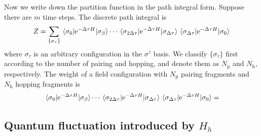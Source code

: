 \documentclass[hyperref, a4paper]{article}
\newcommand*{\ee}{\mathrm{e}}
\begin{document}
Now we write down the partition function in the path integral form.
Suppose there are $m$ time steps. The discrete path integral is 
\begin{equation}
    Z = \sum_{\{\sigma_\tau\}} \mel{\sigma_0}{\ee^{-\Delta \tau H}}{\sigma_\beta} \cdots \mel{\sigma_{2\Delta \tau}}{\ee^{-\Delta \tau H}}{\sigma_{\Delta \tau}} \mel{\sigma_{\Delta \tau}}{\ee^{-\Delta \tau H}}{\sigma_{0}}  
\end{equation}
where $\sigma_\tau$ is an arbitrary configuration in the $\sigma^z$ basis.
We classify $\{\sigma_\tau\}$ first according to the number of pairing and hopping, and denote them as $N_\text{p}$ and $N_\text{h}$, respectively.
The weight of a field configuration with $N_\text{p}$ pairing fragments and $N_\text{h}$ hopping fragments is
\[
    \mel{\sigma_0}{\ee^{-\Delta \tau H}}{\sigma_\beta} \cdots \mel{\sigma_{2\Delta \tau}}{\ee^{-\Delta \tau H}}{\sigma_{\Delta \tau}} \mel{\sigma_{\Delta \tau}}{\ee^{-\Delta \tau H}}{\sigma_{0}} = 
\]

\subsection{Quantum fluctuation introduced by $H_h$}
\end{document}
